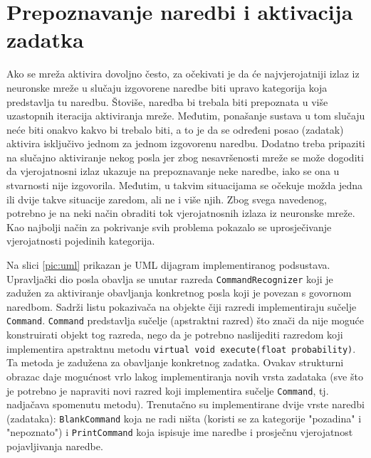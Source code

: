 \section{Prepoznavanje naredbi i aktivacija zadatka}
\label{sec:prepoy}

Ako se mreža aktivira dovoljno često, za očekivati je da će najvjerojatniji izlaz iz 
neuronske mreže u slučaju izgovorene naredbe biti upravo kategorija koja predstavlja tu naredbu. 
Štoviše, naredba bi trebala biti prepoznata u više uzastopnih iteracija aktiviranja mreže.
Međutim, ponašanje sustava u tom slučaju neće biti onakvo kakvo bi trebalo biti, a to je da se
određeni posao (zadatak) aktivira isključivo jednom za jednom izgovorenu naredbu. 
Dodatno treba pripaziti na slučajno aktiviranje nekog posla jer zbog
nesavršenosti mreže se može dogoditi da vjerojatnosni izlaz ukazuje na prepoznavanje neke
naredbe, iako se ona u stvarnosti nije izgovorila. Međutim, u takvim situacijama se očekuje možda jedna ili dvije takve situacije zaredom,
ali ne i više njih. Zbog svega navedenog, potrebno je na neki način obraditi tok vjerojatnosnih
izlaza iz neuronske mreže. Kao najbolji način za pokrivanje svih problema pokazalo se 
uprosječivanje vjerojatnosti pojedinih kategorija. 

Na slici \ref{pic:uml} prikazan je UML dijagram implementiranog podsustava. Upravljački dio posla
obavlja se unutar razreda \texttt{CommandRecognizer} koji je zadužen za aktiviranje obavljanja 
konkretnog posla koji je povezan s govornom naredbom. 
Sadrži listu pokazivača na objekte čiji razredi implementiraju 
sučelje \texttt{Command}. \texttt{Command} predstavlja sučelje (apstraktni razred) što znači da
nije moguće konstruirati objekt tog razreda, nego da je potrebno naslijediti razredom koji 
implementira apstraktnu metodu \texttt{virtual void execute(float probability)}. Ta 
metoda je zadužena za obavljanje konkretnog zadatka. Ovakav strukturni
obrazac daje mogućnost vrlo lakog implementiranja novih vrsta zadataka (sve što je potrebno je 
napraviti novi razred koji implementira sučelje \texttt{Command}, tj. nadjačava
spomenutu metodu). Trenutačno su implementirane
dvije vrste naredbi (zadataka): \texttt{BlankCommand} koja ne radi ništa (koristi se za kategorije
"pozadina" i "nepoznato") i \texttt{PrintCommand} koja ispisuje ime naredbe i prosječnu 
vjerojatnost pojavljivanja naredbe.

